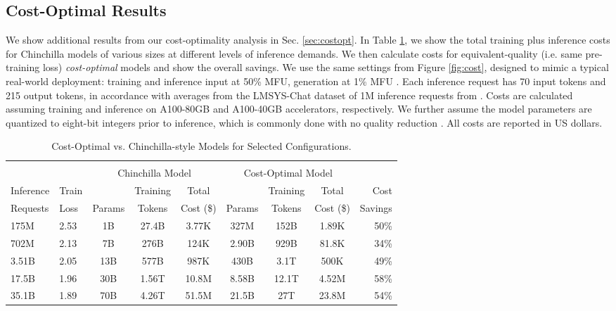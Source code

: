 \subsection{Cost-Optimal Results}\label{sec:costoptappendix}
We show additional results from our cost-optimality analysis in Sec. \ref{sec:costopt}. In Table \ref{table:costtable}, we show the total training plus inference costs for Chinchilla models of various sizes at different levels of inference demands. We then calculate costs for equivalent-quality (i.e. same pre-training loss) \textit{cost-optimal} models and show the overall savings. We use the same settings from Figure \ref{fig:cost}, designed to mimic a typical real-world deployment: training and inference input at 50\% MFU, generation at 1\% MFU \cite{megatronlm, palminference}. Each inference request has 70 input tokens and 215 output tokens, in accordance with averages from the 
LMSYS-Chat dataset of 1M inference requests from \citet{lmsys}. Costs are calculated assuming training and inference on A100-80GB and A100-40GB accelerators, respectively. We further assume the model parameters are quantized to eight-bit integers prior to inference, which is commonly done with no quality reduction \cite{smoothquant}. All costs are reported in US dollars.


\begin{table}
  \caption{Cost-Optimal vs. Chinchilla-style Models for Selected Configurations.}
  \label{table:costtable}
  \centering
  \begin{tabular}{llccccccr}
    \toprule
    & & & & & & & \\
    & & \multicolumn{3}{c}{Chinchilla Model} & \multicolumn{3}{c}{Cost-Optimal Model} \\
    \cmidrule(r){3-5} \cmidrule(r){6-8}
    Inference & Train & & Training & Total  &  & Training & Total  & Cost
    \\ Requests & Loss & Params & Tokens & Cost (\$) & Params & Tokens & Cost (\$) & Savings\\
    \midrule
    175M & 2.53 & 1B & 27.4B  & 3.77K & 327M  & 152B &  1.89K & 50\% \\
    702M & 2.13 & 7B & 276B & 124K     & 2.90B & 929B  & 81.8K & 34\%    \\
    3.51B & 2.05 & 13B & 577B & 987K & 430B & 3.1T & 500K & 49\% \\
    17.5B & 1.96 & 30B & 1.56T & 10.8M & 8.58B & 12.1T & 4.52M & 58\% \\
    35.1B & 1.89 & 70B & 4.26T & 51.5M & 21.5B & 27T & 23.8M & 54\% \\
    \bottomrule
  \end{tabular}
\end{table}

